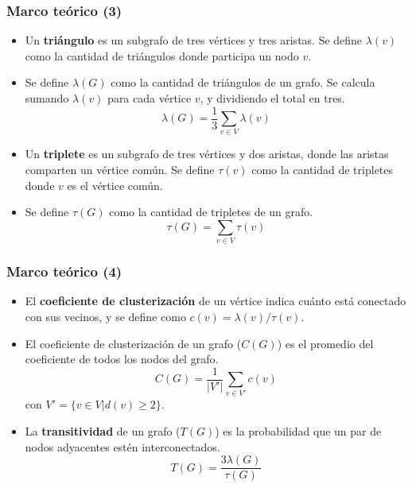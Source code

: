 \begin{frame}
\frametitle{Marco teórico (3)}

\begin{itemize}
	\item Un \textbf{triángulo} es un subgrafo de tres vértices y tres aristas. Se define $\lambda(v)$ como la cantidad de triángulos donde participa un nodo $v$.
	\item Se define $\lambda(G)$ como la cantidad de triángulos de un grafo. Se calcula sumando $\lambda(v)$ para cada vértice $v$, y dividiendo el total en tres.
	\begin{equation}
		\lambda(G) = \dfrac{1}{3} \sum_{v \in V} \lambda(v) \label{eq:triangles}
	\end{equation}
	
	\item Un \textbf{triplete} es un subgrafo de tres vértices y dos aristas, donde las aristas comparten un vértice común. Se define $\tau(v)$ como la cantidad de tripletes donde $v$ es el vértice común.
	\item Se define $\tau(G)$ como la cantidad de tripletes de un grafo.
	\begin{equation}
		\tau(G) = \sum_{v \in V} \tau(v) \label{eq:triplets}
	\end{equation}
\end{itemize}

\end{frame}

\begin{frame}
\frametitle{Marco teórico (4)}

\begin{itemize}
	\item El \textbf{coeficiente de clusterización} de un vértice indica cuánto está conectado con sus vecinos, y se define como $c(v) =  \lambda(v) / \tau(v)$. 
	\item El coeficiente de clusterización de un grafo ($C(G)$) es el promedio del coeficiente de todos los nodos del grafo.
	\begin{equation}
		C(G) = \dfrac{1}{|V'|} \sum_{v \in V'} c(v)\label{eq:CC}
	\end{equation}
	con $V' = \{ v \in V | d(v) \geq 2 \}$.
	
	\item La \textbf{transitividad} de un grafo ($T(G)$) es la probabilidad que un par de nodos adyacentes estén interconectados.
	\begin{equation}
		T(G) = \dfrac{3 \lambda(G)}{\tau(G)} \label{eq:T} 
	\end{equation}
\end{itemize}

\end{frame}
